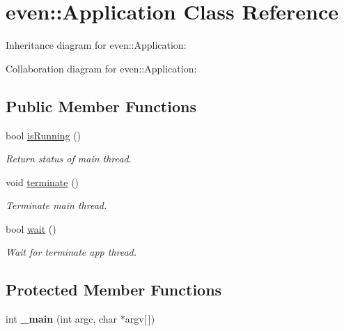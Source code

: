 \hypertarget{classeven_1_1_application}{}\section{even\+:\+:Application Class Reference}
\label{classeven_1_1_application}


Inheritance diagram for even\+:\+:Application\+:


Collaboration diagram for even\+:\+:Application\+:
\subsection*{Public Member Functions}
\begin{DoxyCompactItemize}
\item 
\mbox{\label{classeven_1_1_application_ad0110037a5d4b8ac3bb676332c46e1d1}} 
bool \mbox{\hyperlink{classeven_1_1_application_ad0110037a5d4b8ac3bb676332c46e1d1}{is\+Running}} ()
\begin{DoxyCompactList}\small\item\em Return status of main thread. \end{DoxyCompactList}\item 
\mbox{\label{classeven_1_1_application_a5974dc3b4e119641d425ad88723d4489}} 
void \mbox{\hyperlink{classeven_1_1_application_a5974dc3b4e119641d425ad88723d4489}{terminate}} ()
\begin{DoxyCompactList}\small\item\em Terminate main thread. \end{DoxyCompactList}\item 
bool \mbox{\hyperlink{classeven_1_1_application_abcd00f11978265d2dcd3dfb962c671dc}{wait}} ()
\begin{DoxyCompactList}\small\item\em Wait for terminate app thread. \end{DoxyCompactList}\end{DoxyCompactItemize}
\subsection*{Protected Member Functions}
\begin{DoxyCompactItemize}
\item 
\mbox{\label{classeven_1_1_application_a3ea05c39062c60a11312efcfd7aefd6e}} 
int {\bfseries \+\_\+main} (int argc, char $\ast$argv\mbox{[}$\,$\mbox{]})
\end{DoxyCompactItemize}
